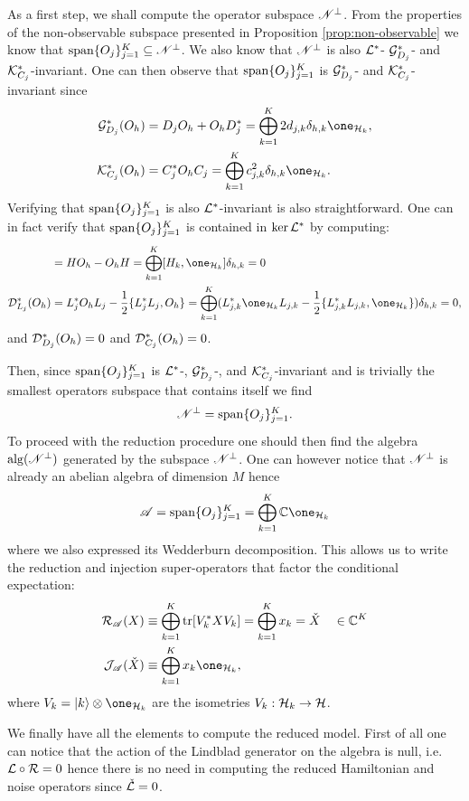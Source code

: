 \documentclass[aihp,12pt]{imsart}
\begin{document}
As a first step, we shall compute the operator subspace $\mathscr{N}^\perp$. From the properties of the non-observable subspace presented in Proposition \ref{prop:non-observable} we know that ${\rm span}\{O_j\}_{j=1}^K\subseteq\mathscr{N}^\perp$. We also know that $\mathscr{N}^\perp$ is also $\mathcal{L}^*$- $\mathcal{G}_{D_j}^*$- and $\mathcal{K}_{C_j}^*$-invariant. One can then observe that ${\rm span}\{O_j\}_{j=1}^K$ is $\mathcal{G}_{D_j}^*$- and $\mathcal{K}_{C_j}^*$-invariant since 
\begin{align*}
    \Gc_{D_j}^*(O_h) &= D_j O_h + O_h D_j^* = \bigoplus_{k=1}^K 2d_{j,k}\delta_{h,k}\one_{\Hc_k},\\
    \Kc_{C_j}^*(O_h) &= C_j^* O_h C_j = \bigoplus_{k=1}^K c_{j,k}^2\delta_{h,k}\one_{\Hc_k}.
\end{align*}
Verifying that ${\rm span}\{O_j\}_{j=1}^K$ is also $\mathcal{L}^*$-invariant is also straightforward. One can in fact verify that ${\rm span}\{O_j\}_{j=1}^K$ is contained in $\ker\mathcal{L}^*$ by computing:
\begin{align*}
    [H,O_h] &= HO_h - O_hH = \bigoplus_{k=1}^K [H_k, \one_{\Hc_k}]\delta_{h,k} = 0\\
    \Dc_{L_j}^*(O_h) &= L_j^* O_h L_j -\frac{1}{2}\{L_j^* L_j, O_h\} = \bigoplus_{k=1}^K (L_{j,k}^* \one_{\Hc_k} L_{j,k} - \frac{1}{2} \{L_{j,k}^*  L_{j,k}, \one_{\Hc_k}\} )\delta_{h,k}=0,
\end{align*}
and $\mathcal{D}_{D_j}^*(O_h) = 0$ and $\mathcal{D}_{C_j}^*(O_h)=0$.

Then, since ${\rm span}\{O_j\}_{j=1}^K$ is $\mathcal{L}^*$-, $\mathcal{G}_{D_j}^*$-, and $\mathcal{K}_{C_j}^*$-invariant and is trivially the smallest operators subspace that contains itself we find
\[\mathscr{N}^\perp = {\rm span}\{O_j\}_{j=1}^K. \]
To proceed with the reduction procedure one should then find the algebra ${\rm alg}(\mathscr{N}^\perp)$ generated by the subspace $\mathscr{N}^\perp$. One can however notice that $\mathscr{N}^\perp$ is already an abelian algebra of dimension $M$ hence \[\As = \Span\{O_j\}_{j=1}^K = \bigoplus_{k=1}^K \Cb  \one_{\Hc_k}\]
where we also expressed its Wedderburn decomposition. This allows us to write the reduction and injection super-operators that factor the conditional expectation:
\begin{align*}
    \Rc_\As(X) &\equiv \bigoplus_{k=1}^K \tr[ V_k^* X V_k]  = \bigoplus_{k=1}^K x_k = \check{X} \quad \in\Cb^K \\
    \Jc_\As(\check{X}) &\equiv \bigoplus_{k=1}^K x_k \one_{\Hc_k},
\end{align*}
where $V_k = \ket{k} \otimes \one_{\Hc_k}$ are the isometries $V_k:\mathcal{H}_k\to\mathcal{H}$. 

We finally have all the elements to compute the reduced model. 
First of all one can notice that the action of the Lindblad generator on the algebra is null, i.e. $\mathcal{L}\circ\mathcal{R} = 0$ hence there is no need in computing the reduced Hamiltonian and noise operators since $\check{\mathcal{L}}=0$.
\end{document}
